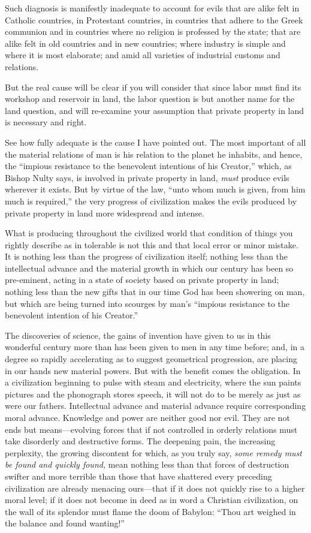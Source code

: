 \documentclass{book}
\begin{document}
Such diagnosis is manifestly inadequate to account for evils that are alike felt in Catholic countries, in Protestant countries, in countries that adhere to the Greek communion and in countries where no religion is professed by the state; that are alike felt in old countries and in new countries; where industry is simple and where it is most elaborate; and amid all varieties of industrial customs and relations.

But the real cause will be clear if you will consider that since labor must find its workshop and reservoir in land, the labor question is but another name for the land question, and will re-examine your assumption that private property in land is necessary and right.

See how fully adequate is the cause I have pointed out. The most important of all the material relations of man is his relation to the planet he inhabits, and hence, the “impious resistance to the benevolent intentions of his Creator,” which, as Bishop Nulty says, is involved in private property in land, \emph{must} produce evils wherever it exists. But by virtue of the law, “unto whom much is given, from him much is required,” the very progress of civilization makes the evils produced by private property in land more widespread and intense.

What is producing throughout the civilized world that condition of things you rightly describe as in tolerable is not this and that local error or minor mistake. It is nothing less than the progress of civilization itself; nothing less than the intellectual advance and the material growth in which our century has been so pre-eminent, acting in a state of society based on private property in land; nothing less than the new gifts that in our time God has been showering on man, but which are being turned into scourges by man’s “impious resistance to the benevolent intention of his Creator.”

The discoveries of science, the gains of invention have given to us in this wonderful century more than has been given to men in any time before; and, in a degree so rapidly accelerating as to suggest geometrical progression, are placing in our hands new material powers. But with the benefit comes the obligation. In a civilization beginning to pulse with steam and electricity, where the sun paints pictures and the phonograph stores speech, it will not do to be merely as just as were our fathers. Intellectual advance and material advance require corresponding moral advance. Knowledge and power are neither good nor evil. They are not ends but means—evolving forces that if not controlled in orderly relations must take disorderly and destructive forms. The deepening pain, the increasing perplexity, the growing discontent for which, as you truly say, \emph{some remedy must be found and quickly found,} mean nothing less than that forces of destruction swifter and more terrible than those that have shattered every preceding civilization are already menacing ours—that if it does not quickly rise to a higher moral level; if it does not become in deed as in word a Christian civilization, on the wall of its splendor must flame the doom of Babylon: “Thou art weighed in the balance and found wanting!”
\end{document}
